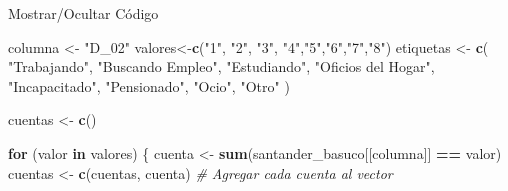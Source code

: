 \documentclass[
]{article}
\newenvironment{Shaded}{\begin{snugshade}}{\end{snugshade}}
\newcommand{\CommentTok}[1]{\textcolor[rgb]{0.56,0.35,0.01}{\textit{#1}}}
\newcommand{\ControlFlowTok}[1]{\textcolor[rgb]{0.13,0.29,0.53}{\textbf{#1}}}
\newcommand{\FunctionTok}[1]{\textcolor[rgb]{0.13,0.29,0.53}{\textbf{#1}}}
\newcommand{\NormalTok}[1]{#1}
\newcommand{\OtherTok}[1]{\textcolor[rgb]{0.56,0.35,0.01}{#1}}
\newcommand{\SpecialCharTok}[1]{\textcolor[rgb]{0.81,0.36,0.00}{\textbf{#1}}}
\newcommand{\StringTok}[1]{\textcolor[rgb]{0.31,0.60,0.02}{#1}}
\begin{document}
Mostrar/Ocultar Código

\label{section5}
\begin{Shaded}
\begin{Highlighting}[]
\NormalTok{columna }\OtherTok{\textless{}{-}} \StringTok{"D\_02"}
\NormalTok{valores}\OtherTok{\textless{}{-}}\FunctionTok{c}\NormalTok{(}\StringTok{"1"}\NormalTok{, }\StringTok{"2"}\NormalTok{, }\StringTok{"3"}\NormalTok{, }\StringTok{"4"}\NormalTok{,}\StringTok{"5"}\NormalTok{,}\StringTok{"6"}\NormalTok{,}\StringTok{"7"}\NormalTok{,}\StringTok{"8"}\NormalTok{)}
\NormalTok{etiquetas }\OtherTok{\textless{}{-}} \FunctionTok{c}\NormalTok{(}
  \StringTok{"Trabajando"}\NormalTok{,}
  \StringTok{"Buscando Empleo"}\NormalTok{,}
  \StringTok{"Estudiando"}\NormalTok{,}
  \StringTok{"Oficios del Hogar"}\NormalTok{,}
  \StringTok{"Incapacitado"}\NormalTok{,}
  \StringTok{"Pensionado"}\NormalTok{,}
  \StringTok{"Ocio"}\NormalTok{,}
  \StringTok{"Otro"}
\NormalTok{)}

\NormalTok{cuentas }\OtherTok{\textless{}{-}} \FunctionTok{c}\NormalTok{()}

\ControlFlowTok{for}\NormalTok{ (valor }\ControlFlowTok{in}\NormalTok{ valores) \{}
\NormalTok{  cuenta }\OtherTok{\textless{}{-}} \FunctionTok{sum}\NormalTok{(santander\_basuco[[columna]] }\SpecialCharTok{==}\NormalTok{ valor)}
\NormalTok{  cuentas }\OtherTok{\textless{}{-}} \FunctionTok{c}\NormalTok{(cuentas, cuenta)  }\CommentTok{\# Agregar cada cuenta al vector}
  

\end{Highlighting}
\end{Shaded}
\end{document}
